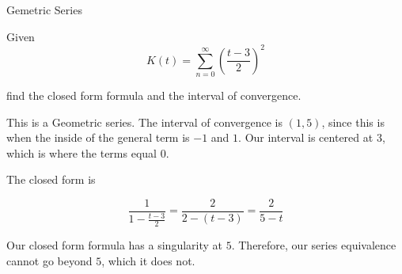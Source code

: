 \documentclass{ximera}
\begin{document}
\begin{example} Gemetric Series


Given 
\[    K(t) =   \sum_{n=0}^{\infty}  \left( \frac{t-3}{2} \right)^2\]

find the closed form formula and the interval of convergence.




\begin{explanation}


This is a Geometric series.  The interval of convergence is $(1, 5)$, since this is when the inside of the general term is $-1$ and $1$. Our interval is centered at $3$, which is where the terms equal $0$.


The closed form is

\[  \frac{1}{1 - \frac{t-3}{2}}  =     \frac{2}{2-(t-3)} =    \frac{2}{5-t}        \]



\end{explanation}


Our closed form formula has a singularity at $5$.  Therefore, our series equivalence cannot go beyond $5$, which it does not.




\begin{center}
\end{center}




\end{example}
\end{document}

